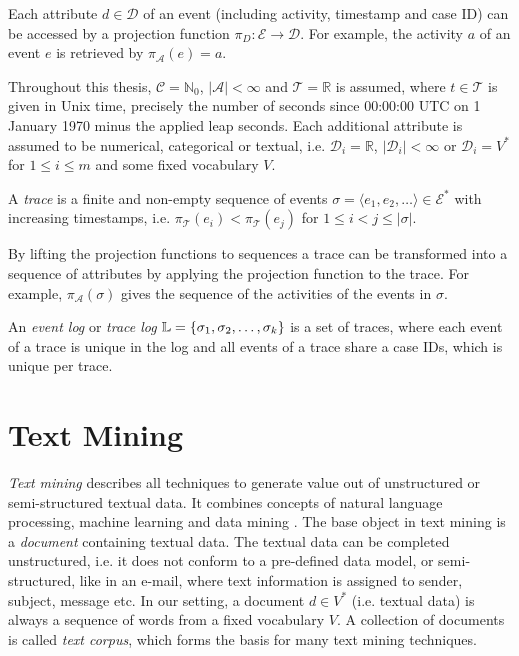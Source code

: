 Each attribute $d \in \mathcal{D}$ of an event (including activity, timestamp and case ID) can be accessed by a projection function $\pi_D \colon \mathcal{E} \to \mathcal{D}$.
For example, the activity $a$ of an event $e$ is retrieved by $\pi_\mathcal{A}(e) = a$.

Throughout this thesis,  $\mathcal{C} = \mathbb{N}_0$, $|\mathcal{A}| < \infty$ and $ \mathcal{T} = \mathbb{R}$ is assumed, where $t \in \mathcal{T}$ is given in Unix time, precisely the number of seconds since 00:00:00 UTC on 1 January 1970 minus the applied leap seconds.
Each additional attribute is assumed to be numerical, categorical or textual, i.e. $\mathcal{D}_i = \mathbb{R}$, $|\mathcal{D}_i| < \infty$ or $\mathcal{D}_i = V^\ast$  for $1 \leq i \leq m$ and some fixed vocabulary $V$.

\begin{definition}[Trace]
	A \textit{trace} is a finite and non-empty sequence of events $\sigma = \langle e_1, e_2, \dots\rangle \in  \mathcal{E}^\ast$ with increasing timestamps, i.e. $\pi_\mathcal{T} (e_i) < \pi_\mathcal{T} (e_j) $ for $1 \leq i < j \leq |\sigma|$.
\end{definition}


By lifting the projection functions to sequences a trace can be transformed into a sequence of attributes by applying the projection function to the trace.
For example, $\pi_\mathcal{A}(\sigma)$ gives the sequence of the activities of the events in $\sigma$.

\begin{definition}
	An \textit{event log} or \textit{trace log} $\mathbb{L} = \{ \sigma_1, \sigma _2, \dots, \sigma_k \}$ is a set of traces, where each event of a trace is unique in the log and all events of a trace share a case IDs, which is unique per trace.
\end{definition}

\section{Text Mining}

\textit{Text mining} describes all techniques to generate value out of unstructured or semi-structured textual data.
It combines concepts of natural language processing, machine learning and data mining \cite{DBLP:journals/coling/Mihalcea08}.
The base object in text mining is a \textit{document} containing textual data.
The textual data can be completed unstructured, i.e. it does not conform to a pre-defined data model, or semi-structured, like in an e-mail, where text information is assigned to sender, subject, message etc.
In our setting, a document $d \in V^*$ (i.e. textual data) is always a sequence of words from a fixed vocabulary $V$.
A collection of documents is called \textit{text corpus}, which forms the basis for many text mining techniques.

